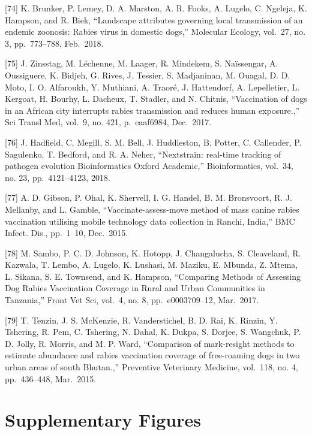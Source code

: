 \documentclass[
]{book}
\begin{document}
{[}74{]} K. Brunker, P. Lemey, D. A. Marston, A. R. Fooks, A. Lugelo, C. Ngeleja, K. Hampson, and R. Biek, ``Landscape attributes governing local transmission of an endemic zoonosis: Rabies virus in domestic dogs,'' Molecular Ecology, vol.~27, no. 3, pp.~773--788, Feb.~2018.

{[}75{]} J. Zinsstag, M. Léchenne, M. Laager, R. Mindekem, S. Naïssengar, A. Oussiguere, K. Bidjeh, G. Rives, J. Tessier, S. Madjaninan, M. Ouagal, D. D. Moto, I. O. Alfaroukh, Y. Muthiani, A. Traoré, J. Hattendorf, A. Lepelletier, L. Kergoat, H. Bourhy, L. Dacheux, T. Stadler, and N. Chitnis, ``Vaccination of dogs in an African city interrupts rabies transmission and reduces human exposure.,'' Sci Transl Med, vol.~9, no. 421, p.~eaaf6984, Dec.~2017.

{[}76{]} J. Hadfield, C. Megill, S. M. Bell, J. Huddleston, B. Potter, C. Callender, P. Sagulenko, T. Bedford, and R. A. Neher, ``Nextstrain: real-time tracking of pathogen evolution \textbar{} Bioinformatics \textbar{} Oxford Academic,'' Bioinformatics, vol.~34, no. 23, pp.~4121--4123, 2018.

{[}77{]} A. D. Gibson, P. Ohal, K. Shervell, I. G. Handel, B. M. Bronsvoort, R. J. Mellanby, and L. Gamble, ``Vaccinate-assess-move method of mass canine rabies vaccination utilising mobile technology data collection in Ranchi, India,'' BMC Infect. Dis., pp.~1--10, Dec.~2015.

{[}78{]} M. Sambo, P. C. D. Johnson, K. Hotopp, J. Changalucha, S. Cleaveland, R. Kazwala, T. Lembo, A. Lugelo, K. Lushasi, M. Maziku, E. Mbunda, Z. Mtema, L. Sikana, S. E. Townsend, and K. Hampson, ``Comparing Methods of Assessing Dog Rabies Vaccination Coverage in Rural and Urban Communities in Tanzania,'' Front Vet Sci, vol.~4, no. 8, pp.~e0003709--12, Mar.~2017.

{[}79{]} T. Tenzin, J. S. McKenzie, R. Vanderstichel, B. D. Rai, K. Rinzin, Y. Tshering, R. Pem, C. Tshering, N. Dahal, K. Dukpa, S. Dorjee, S. Wangchuk, P. D. Jolly, R. Morris, and M. P. Ward, ``Comparison of mark-resight methods to estimate abundance and rabies vaccination coverage of free-roaming dogs in two urban areas of south Bhutan.,'' Preventive Veterinary Medicine, vol.~118, no. 4, pp.~436--448, Mar.~2015.

\hypertarget{supplementary-figures}{%
\section{Supplementary Figures}\label{supplementary-figures}}
\end{document}
